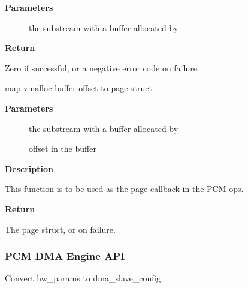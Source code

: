 \documentclass[a4paper,8pt,english]{sphinxmanual}
\begin{document}
\textbf{Parameters}
\begin{description}
\item[{}] \leavevmode
the substream with a buffer allocated by

\end{description}

\textbf{Return}

Zero if successful, or a negative error code on failure.

\begin{fulllineitems}
\label{sound/kernel-api/alsa-driver-api:c.snd_pcm_lib_get_vmalloc_page}
map vmalloc buffer offset to page struct

\end{fulllineitems}


\textbf{Parameters}
\begin{description}
\item[{}] \leavevmode
the substream with a buffer allocated by

\item[{}] \leavevmode
offset in the buffer

\end{description}

\textbf{Description}

This function is to be used as the page callback in the PCM ops.

\textbf{Return}

The page struct, or  on failure.


\subsubsection{PCM DMA Engine API}
\label{sound/kernel-api/alsa-driver-api:pcm-dma-engine-api}

\begin{fulllineitems}
\label{sound/kernel-api/alsa-driver-api:c.snd_hwparams_to_dma_slave_config}
Convert hw\_params to dma\_slave\_config

\end{fulllineitems}
\end{document}
